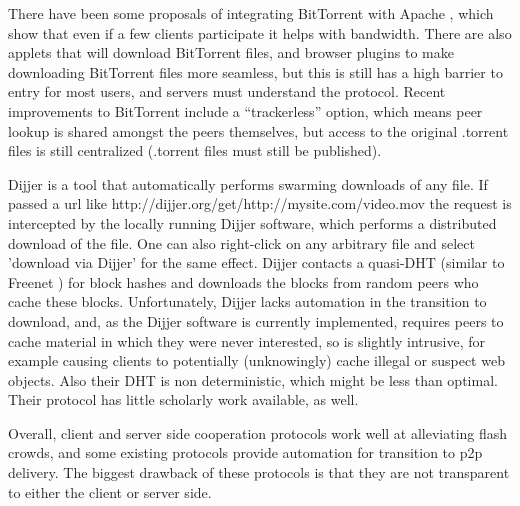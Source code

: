 There have been some proposals of integrating BitTorrent with Apache \cite{webtorrent}, which show that even if a few clients participate it helps with bandwidth.  There are also applets 
 that will download BitTorrent files, and browser plugins to make downloading BitTorrent files more seamless, but this is still has a high barrier to entry for most users, 
 and servers must understand the protocol. Recent improvements to BitTorrent include a ``trackerless'' option, which means peer lookup is 
 shared amongst the peers themselves, but access to the original .torrent files is still centralized (.torrent files must still be published).

Dijjer \cite{dijjer} is a tool that automatically performs swarming downloads of any file.  If passed a url like http://dijjer.org/get/http://mysite.com/video.mov 
the request is intercepted by the locally running Dijjer software, which performs a distributed download of the file.  
One can also right-click on any arbitrary file and select 'download via Dijjer' for the same effect.  
Dijjer contacts a quasi-DHT (similar to Freenet \cite{freenet}) for block hashes and downloads the blocks from random peers who cache 
these blocks.  Unfortunately, Dijjer lacks automation in the transition to download, and, 
as the Dijjer software is currently implemented, requires peers to cache material in which they were never interested, so is slightly intrusive, 
for example causing clients to potentially (unknowingly) cache illegal or suspect web objects.  
Also their DHT is non deterministic, which might be less than optimal.  Their protocol has little scholarly work available, as well.

Overall, client and server side cooperation protocols work well at alleviating flash crowds, 
and some existing protocols provide automation for transition to p2p delivery.  
The biggest drawback of these protocols is that they are not transparent to either the client or server side.

